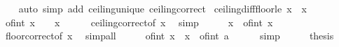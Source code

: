 \begin{isabellebody}
%
\isadelimproof
\ \ %
\endisadelimproof
%
\isatagproof
{}\isamarkupfalse%
\ {\isacharparenleft}{\kern0pt}auto\ simp\ add{\isacharcolon}{\kern0pt}\ ceiling{\isacharunderscore}{\kern0pt}unique\ ceiling{\isacharunderscore}{\kern0pt}correct{\isacharparenright}{\kern0pt}%
\endisatagproof
{\isafoldproof}%
%
\isadelimproof
\isanewline
%
\endisadelimproof
\isanewline
{}\isamarkupfalse%
\ ceiling{\isacharunderscore}{\kern0pt}diff{\isacharunderscore}{\kern0pt}floor{\isacharunderscore}{\kern0pt}le{\isacharunderscore}{\kern0pt}{}{\isacharcolon}{\kern0pt}\ {\isachardoublequoteopen}{\isasymlceil}x{\isasymrceil}\ {\isacharminus}{\kern0pt}\ {\isasymlfloor}x{\isasymrfloor}\ {\isasymle}\ {}{\isachardoublequoteclose}\isanewline
%
\isadelimproof
%
\endisadelimproof
%
\isatagproof
{}\isamarkupfalse%
\ {\isacharminus}{\kern0pt}\isanewline
\ \ \isamarkupfalse%
\ {\isachardoublequoteopen}of{\isacharunderscore}{\kern0pt}int\ {\isasymlceil}x{\isasymrceil}\ {\isacharminus}{\kern0pt}\ {}\ {\isacharless}{\kern0pt}\ x{\isachardoublequoteclose}\isanewline
\ \ \ \ \isamarkupfalse%
\ ceiling{\isacharunderscore}{\kern0pt}correct{\isacharbrackleft}{\kern0pt}of\ x{\isacharbrackright}{\kern0pt}\ \isamarkupfalse%
\ simp\isanewline
\ \ \isamarkupfalse%
\ \isamarkupfalse%
\ {\isachardoublequoteopen}x\ {\isacharless}{\kern0pt}\ of{\isacharunderscore}{\kern0pt}int\ {\isasymlfloor}x{\isasymrfloor}\ {\isacharplus}{\kern0pt}\ {}{\isachardoublequoteclose}\isanewline
\ \ \ \ \isamarkupfalse%
\ floor{\isacharunderscore}{\kern0pt}correct{\isacharbrackleft}{\kern0pt}of\ x{\isacharbrackright}{\kern0pt}\ \isamarkupfalse%
\ simp{\isacharunderscore}{\kern0pt}all\isanewline
\ \ \isamarkupfalse%
\ \isamarkupfalse%
\ {\isachardoublequoteopen}of{\isacharunderscore}{\kern0pt}int\ {\isacharparenleft}{\kern0pt}{\isasymlceil}x{\isasymrceil}\ {\isacharminus}{\kern0pt}\ {\isasymlfloor}x{\isasymrfloor}{\isacharparenright}{\kern0pt}\ {\isacharless}{\kern0pt}\ {\isacharparenleft}{\kern0pt}of{\isacharunderscore}{\kern0pt}int\ {}{\isacharcolon}{\kern0pt}{\isacharcolon}{\kern0pt}{\isacharprime}{\kern0pt}a{\isacharparenright}{\kern0pt}{\isachardoublequoteclose}\isanewline
\ \ \ \ \isamarkupfalse%
\ simp\isanewline
\ \ \isamarkupfalse%
\ \isamarkupfalse%
\ {\isacharquery}{\kern0pt}thesis\isanewline
\ \ \ \ \isamarkupfalse%

\end{isabellebody}
